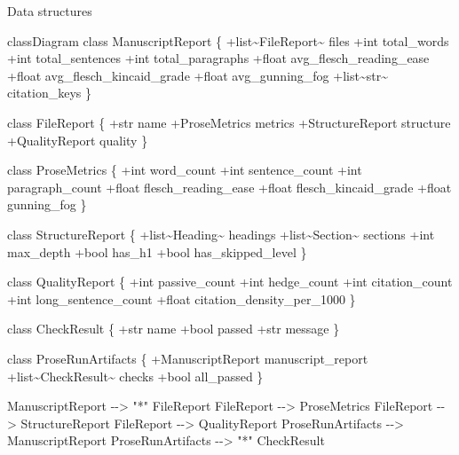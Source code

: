 \documentclass[
  ignorenonframetext,
]{beamer}
\newenvironment{Shaded}{}{}
\newcommand{\NormalTok}[1]{#1}
\begin{document}
\begin{frame}{Data structures}
\protect{}\label{data-structures}
\begin{Shaded}
\begin{Highlighting}[]
\NormalTok{classDiagram}
\NormalTok{    class ManuscriptReport \{}
\NormalTok{        +list\textasciitilde{}FileReport\textasciitilde{} files}
\NormalTok{        +int total\_words}
\NormalTok{        +int total\_sentences}
\NormalTok{        +int total\_paragraphs}
\NormalTok{        +float avg\_flesch\_reading\_ease}
\NormalTok{        +float avg\_flesch\_kincaid\_grade}
\NormalTok{        +float avg\_gunning\_fog}
\NormalTok{        +list\textasciitilde{}str\textasciitilde{} citation\_keys}
\NormalTok{    \}}

\NormalTok{    class FileReport \{}
\NormalTok{        +str name}
\NormalTok{        +ProseMetrics metrics}
\NormalTok{        +StructureReport structure}
\NormalTok{        +QualityReport quality}
\NormalTok{    \}}

\NormalTok{    class ProseMetrics \{}
\NormalTok{        +int word\_count}
\NormalTok{        +int sentence\_count}
\NormalTok{        +int paragraph\_count}
\NormalTok{        +float flesch\_reading\_ease}
\NormalTok{        +float flesch\_kincaid\_grade}
\NormalTok{        +float gunning\_fog}
\NormalTok{    \}}

\NormalTok{    class StructureReport \{}
\NormalTok{        +list\textasciitilde{}Heading\textasciitilde{} headings}
\NormalTok{        +list\textasciitilde{}Section\textasciitilde{} sections}
\NormalTok{        +int max\_depth}
\NormalTok{        +bool has\_h1}
\NormalTok{        +bool has\_skipped\_level}
\NormalTok{    \}}

\NormalTok{    class QualityReport \{}
\NormalTok{        +int passive\_count}
\NormalTok{        +int hedge\_count}
\NormalTok{        +int citation\_count}
\NormalTok{        +int long\_sentence\_count}
\NormalTok{        +float citation\_density\_per\_1000}
\NormalTok{    \}}

\NormalTok{    class CheckResult \{}
\NormalTok{        +str name}
\NormalTok{        +bool passed}
\NormalTok{        +str message}
\NormalTok{    \}}

\NormalTok{    class ProseRunArtifacts \{}
\NormalTok{        +ManuscriptReport manuscript\_report}
\NormalTok{        +list\textasciitilde{}CheckResult\textasciitilde{} checks}
\NormalTok{        +bool all\_passed}
\NormalTok{    \}}

\NormalTok{    ManuscriptReport {-}{-}\textgreater{} "*" FileReport}
\NormalTok{    FileReport {-}{-}\textgreater{} ProseMetrics}
\NormalTok{    FileReport {-}{-}\textgreater{} StructureReport}
\NormalTok{    FileReport {-}{-}\textgreater{} QualityReport}
\NormalTok{    ProseRunArtifacts {-}{-}\textgreater{} ManuscriptReport}
\NormalTok{    ProseRunArtifacts {-}{-}\textgreater{} "*" CheckResult}
\end{Highlighting}
\end{Shaded}
\end{frame}
\end{document}
